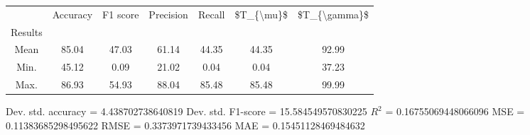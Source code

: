 \begin{tabular}{|c|c|c|c|c|c|c|}
\toprule
{} &  Accuracy &  F1 score &  Precision &  Recall &  \$T\_\{\textbackslash mu\}\$ &  \$T\_\{\textbackslash gamma\}\$ \\
Results &           &           &            &         &            &               \\
\hline
Mean    &     85.04 &     47.03 &      61.14 &   44.35 &      44.35 &         92.99 \\
Min.    &     45.12 &      0.09 &      21.02 &    0.04 &       0.04 &         37.23 \\
Max.    &     86.93 &     54.93 &      88.04 &   85.48 &      85.48 &         99.99 \\
\bottomrule
\end{tabular}

 Dev. std. accuracy = 4.438702738640819
 Dev. std. F1-score = 15.584549570830225
 $R^2$ = 0.16755069448066096
 MSE = 0.11383685298495622
 RMSE = 0.3373971739433456
 MAE = 0.15451128469484632